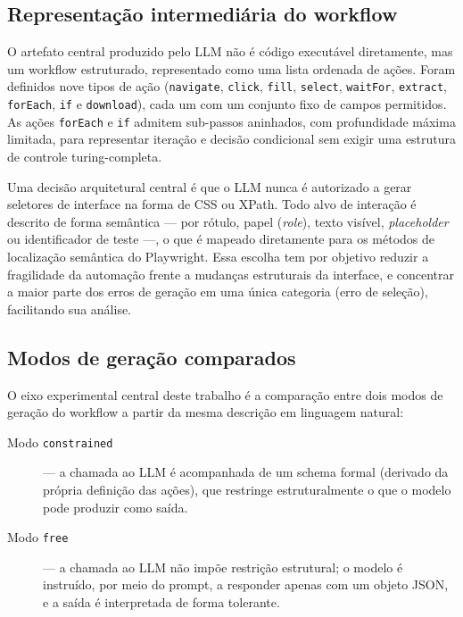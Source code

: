 \documentclass[
	article,
	12pt,
	oneside,
	a4paper,
	section=TITLE,
	english,
	brazil,
	sumario=tradicional
	]{abntex2}
\begin{document}
\subsection{Representação intermediária do workflow}

O artefato central produzido pelo LLM não é código executável diretamente,
mas um workflow estruturado, representado como uma lista ordenada de
ações. Foram definidos nove tipos de ação (\texttt{navigate}, \texttt{click},
\texttt{fill}, \texttt{select}, \texttt{waitFor}, \texttt{extract},
\texttt{forEach}, \texttt{if} e \texttt{download}), cada um com um
conjunto fixo de campos permitidos. As ações \texttt{forEach} e \texttt{if}
admitem sub-passos aninhados, com profundidade máxima limitada, para
representar iteração e decisão condicional sem exigir uma estrutura de
controle turing-completa.

Uma decisão arquitetural central é que o LLM nunca é autorizado a gerar
seletores de interface na forma de CSS ou XPath. Todo alvo de interação é
descrito de forma semântica --- por rótulo, papel (\textit{role}), texto
visível, \textit{placeholder} ou identificador de teste ---, o que é
mapeado diretamente para os métodos de localização semântica do
Playwright. Essa escolha tem por objetivo reduzir a fragilidade da
automação frente a mudanças estruturais da interface, e concentrar a
maior parte dos erros de geração em uma única categoria (erro de seleção),
facilitando sua análise.

\subsection{Modos de geração comparados}

O eixo experimental central deste trabalho é a comparação entre dois
modos de geração do workflow a partir da mesma descrição em linguagem
natural:

\begin{description}
\item[Modo \texttt{constrained}] --- a chamada ao LLM é acompanhada de um
schema formal (derivado da própria definição das ações), que restringe
estruturalmente o que o modelo pode produzir como saída.
\item[Modo \texttt{free}] --- a chamada ao LLM não impõe restrição
estrutural; o modelo é instruído, por meio do prompt, a responder apenas
com um objeto JSON, e a saída é interpretada de forma tolerante.
\end{description}
\end{document}
